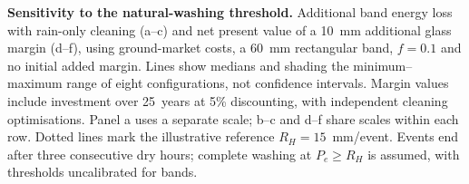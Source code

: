 \caption{\textbf{Sensitivity to the natural-washing threshold.} Additional band energy loss with rain-only cleaning (a--c) and net present value of a 10~mm additional glass margin (d--f), using ground-market costs, a 60~mm rectangular band, $f=0.1$ and no initial added margin. Lines show medians and shading the minimum--maximum range of eight configurations, not confidence intervals. Margin values include investment over 25~years at 5\% discounting, with independent cleaning optimisations. Panel a uses a separate scale; b--c and d--f share scales within each row. Dotted lines mark the illustrative reference $R_H=15$~mm/event. Events end after three consecutive dry hours; complete washing at $P_e\geq R_H$ is assumed, with thresholds uncalibrated for bands.\label{fig:ed-washing-sensitivity}}
